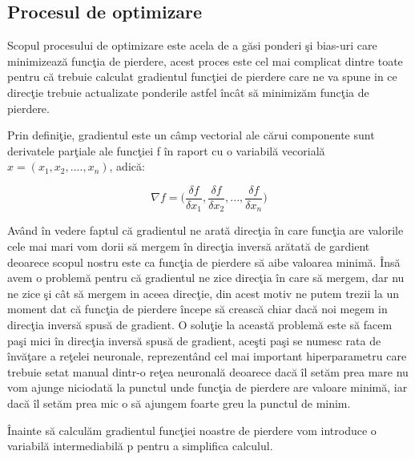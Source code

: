 \subsection{Procesul de optimizare}

Scopul procesului de optimizare este acela de a g\u{a}si  ponderi \c{s}i bias-uri care minimizeaz\u{a} func\c{t}ia de pierdere, acest proces este cel mai complicat dintre toate pentru c\u{a} trebuie calculat gradientul func\c{t}iei de pierdere care ne va spune in ce direc\c{t}ie trebuie actualizate ponderile astfel \^{i}nc\^{a}t s\u{a} minimiz\u{a}m func\c{t}ia de pierdere.

\par 

Prin defini\c{t}ie, gradientul este un c\^{a}mp vectorial ale c\u{a}rui componente sunt derivatele par\c{t}iale ale func\c{t}iei f \^{i}n raport cu o variabil\u{a} vecorial\u{a} $x = (x_1, x_2, ...., x_n)$, adic\u{a}:

$$\nabla f = \bigg( \frac{\delta f}{\delta x_1}, \frac{\delta f}{\delta x_2}, ... , \frac{\delta f}{\delta x_n}  \bigg)$$

Av\^{a}nd \^{i}n vedere faptul c\u{a} gradientul ne arat\u{a} direc\c{t}ia \^{i}n care func\c{t}ia are valorile cele mai mari vom dorii s\u{a} mergem \^{i}n direc\c{t}ia invers\u{a} ar\u{a}tat\u{a} de gardient deoarece scopul nostru este ca func\c{t}ia de pierdere s\u{a} aibe valoarea minim\u{a}. \^{I}ns\u{a} avem o problem\u{a} pentru c\u{a} gradientul ne zice direc\c{t}ia \^{i}n care s\u{a} mergem, dar nu ne zice \c{s}i c\^{a}t s\u{a} mergem in aceea direc\c{t}ie, din acest motiv ne putem trezii la un moment dat c\u{a} func\c{t}ia de pierdere \^{i}ncepe s\u{a} creasc\u{a} chiar dac\u{a} noi megem in direc\c{t}ia invers\u{a} spus\u{a} de gradient. O solu\c{t}ie la aceast\u{a} problem\u{a} este s\u{a} facem pa\c{s}i mici \^{i}n direc\c{t}ia invers\u{a} spus\u{a} de gradient, ace\c{s}ti pa\c{s}i se numesc rata de \^{i}nv\u{a}\c{t}are a re\c{t}elei neuronale, reprezent\^{a}nd cel mai important hiperparametru care trebuie setat manual dintr-o re\c{t}ea neuronal\u{a} deoarece dac\u{a} \^{i}l set\u{a}m prea mare nu vom ajunge niciodat\u{a} la punctul unde func\c{t}ia de pierdere are valoare minim\u{a}, iar dac\u{a} \^{i}l set\u{a}m prea mic o s\u{a} ajungem foarte greu la punctul de minim.

\par

\^{I}nainte s\u{a} calcul\u{a}m gradientul func\c{t}iei noastre de pierdere vom introduce o variabil\u{a} intermediabil\u{a} p pentru a simplifica calculul.

